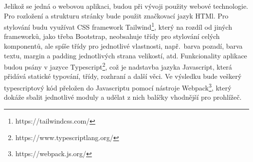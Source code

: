 Jelikož se jedná o webovou aplikaci, budou při vývoji použity webové technologie. Pro rozložení a strukturu stránky bude použit značkovací jazyk HTMl. Pro stylování budu využívat CSS framework Tailwind\footnote{https://tailwindcss.com/}, který na rozdíl od jiných frameworků, jako třeba Bootstrap, neobsahuje třídy pro stylování celých komponentů, ale spíše třídy pro jednotlivé vlastnosti, např.~barva pozadí, barva textu, margin a padding jednotlivých strana velikostí, atd. Funkcionality aplikace budou psány v jazyce Typescript\footnote{https://www.typescriptlang.org/}, což je nadstavba jazyka Javascript, která přidává statické typování, třídy, rozhraní a další věci. Ve výsledku bude veškerý typescriptový kód přeložen do Javascriptu pomocí nástroje Webpack\footnote{https://webpack.js.org/}, který dokáže sbalit jednotlivé moduly a udělat z nich balíčky vhodnější pro prohlížeč.

\endinput